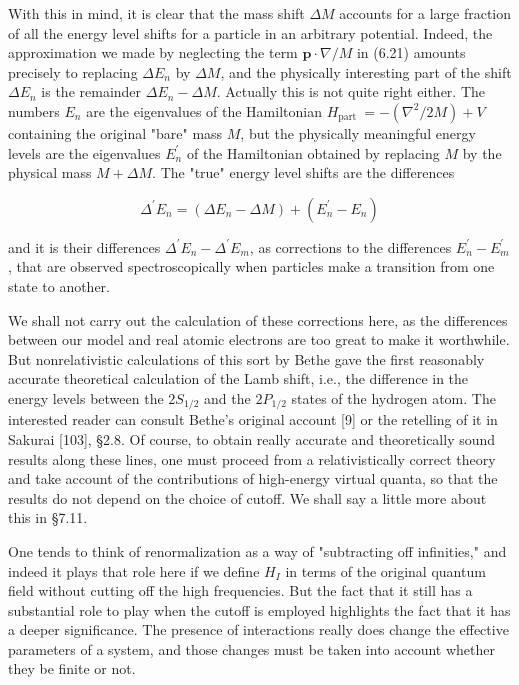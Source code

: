 \documentclass[10pt, letterpaper]{article}
\begin{document}
With this in mind, it is clear that the mass shift $\Delta M$ accounts for a large fraction of all the energy level shifts for a particle in an arbitrary potential. Indeed, the approximation we made by neglecting the term $\mathbf{p} \cdot \nabla / M$ in (6.21) amounts precisely to replacing $\Delta E_{n}$ by $\Delta M$, and the physically interesting part of the shift $\Delta E_{n}$ is the remainder $\Delta E_{n}-\Delta M$. Actually this is not quite right either. The numbers $E_{n}$ are the eigenvalues of the Hamiltonian $H_{\text {part }}=-\left(\nabla^{2} / 2 M\right)+V$ containing the original "bare" mass $M$, but the physically meaningful energy levels are the eigenvalues $E_{n}^{\prime}$ of the Hamiltonian obtained by replacing $M$ by the physical mass $M+\Delta M$. The "true" energy level shifts are the differences

$$
\Delta^{\prime} E_{n}=\left(\Delta E_{n}-\Delta M\right)+\left(E_{n}^{\prime}-E_{n}\right)
$$

and it is their differences $\Delta^{\prime} E_{n}-\Delta^{\prime} E_{m}$, as corrections to the differences $E_{n}^{\prime}-E_{m}^{\prime}$, that are observed spectroscopically when particles make a transition from one state to another.

We shall not carry out the calculation of these corrections here, as the differences between our model and real atomic electrons are too great to make it worthwhile. But nonrelativistic calculations of this sort by Bethe gave the first reasonably accurate theoretical calculation of the Lamb shift, i.e., the difference in the energy levels between the $2 S_{1 / 2}$ and the $2 P_{1 / 2}$ states of the hydrogen atom. The interested reader can consult Bethe's original account [9] or the retelling of it in Sakurai [103], §2.8. Of course, to obtain really accurate and theoretically sound results along these lines, one must proceed from a relativistically correct theory and take account of the contributions of high-energy virtual quanta, so that the results do not depend on the choice of cutoff. We shall say a little more about this in §7.11.

One tends to think of renormalization as a way of "subtracting off infinities," and indeed it plays that role here if we define $H_{I}$ in terms of the original quantum field without cutting off the high frequencies. But the fact that it still has a substantial role to play when the cutoff is employed highlights the fact that it has a deeper significance. The presence of interactions really does change the effective parameters of a system, and those changes must be taken into account whether they be finite or not.
\end{document}
